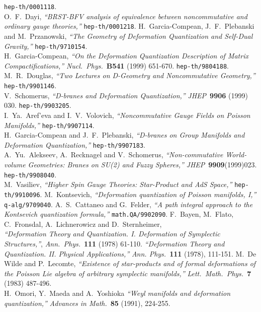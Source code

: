 \documentclass[10pt,a4paper]{article}
\begin{document}
\begin{thebibliography}{99}
{\tt hep-th/0001118}.\\
O.~F.~Dayi,
{\it ``BRST-BFV analysis of equivalence between noncommutative and ordinary gauge theories,''}
{\tt hep-th/0001218}.
H.~Garcia-Compean, J.~F.~Plebanski and M.~Przanowski,
{\it ``The Geometry of Deformation Quantization and Self-Dual Gravity,''}
{\tt hep-th/9710154}.\\
H.~Garcia-Compean,
{\it ``On the Deformation Quantization Description of Matrix Compactifications,''}
{\sl Nucl.~Phys.}~{\bf B541} (1999) 651-670. 
{\tt hep-th/9804188}.\\
M.~R.~Douglas,
{\it ``Two Lectures on D-Geometry and Noncommutative Geometry,''}
{\tt hep-th/9901146}.\\
V.~Schomerus,
{\it ``D-branes and Deformation Quantization,''}
{\sl JHEP}~{\bf 9906} (1999) 030.
{\tt hep-th/9903205}.\\
I.~Ya.~Aref'eva and I.~V.~Volovich,
{\it ``Noncommutative Gauge Fields on Poisson Manifolds,''}
{\tt hep-th/9907114}.\\
H.~Garcia-Compean and J.~F.~Plebanski,
{\it ``D-branes on Group Manifolds and Deformation Quantization,''}
{\tt hep-th/9907183}.\\
A.~Yu.~Alekseev, A.~Recknagel and V.~Schomerus,
{\it ``Non-commutative World-volume Geometries: Branes on SU(2) and Fuzzy Spheres,''}
{\sl JHEP}~{\bf 9909}(1999)023.
{\tt hep-th/9908040}.\\
M.~Vasiliev,
{\it ``Higher Spin Gauge Theories: Star-Product and AdS Space,''}
{\tt hep-th/9910096}.
M.~Kontsevich,
{\it ``Deformation quantization of Poisson manifolds, I,''}
{\tt q-alg/9709040}.
A.~S.~Cattaneo and G.~Felder,
{\it ``A path integral approach to the Kontsevich quantization formula,''}
{\tt math.QA/9902090}.
F.~Bayen, M.~Flato, C.~Fronsdal, A.~Lichnerowicz and D.~Sternheimer,\\
{\it ``Deformation Theory and Quantization. I. Deformation of Symplectic Structures,''},
{\sl Ann.~Phys.}~{\bf 111} (1978) 61-110.
{\it ``Deformation Theory and Quantization. II. Physical Applications,''}
{\sl Ann. Phys.}~{\bf 111} (1978), 111-151.
M.~De Wilde and P.~Lecomte,
{\it ``Existence of star-products and of formal deformations of the Poisson Lie algebra of arbitrary symplectic manifolds,''}
{\sl Lett.~Math.~Phys.}~{\bf 7} (1983) 487-496.\\
H.~Omori, Y.~Maeda and A.~Yoshioka
{\it ``Weyl manifolds and deformation quantization,''}
{\sl Advances in Math.}~{\bf 85} (1991), 224-255.

\end{thebibliography}
\end{document}
